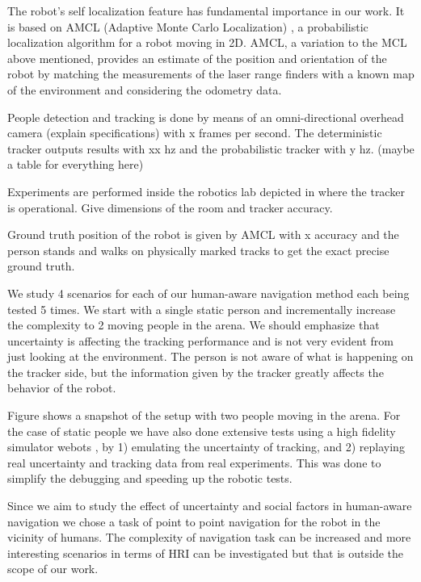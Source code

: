 The robot's self localization feature has fundamental importance in our work.
It is based on AMCL (Adaptive Monte Carlo Localization) \cite{amcl}, a probabilistic localization algorithm for a robot moving in 2D.
AMCL, a variation to the MCL above mentioned, provides an estimate of the position and orientation of the robot by matching the measurements of the laser range finders with a known map of the environment and considering the odometry data.

People detection and tracking is done by means of an omni-directional overhead camera (explain specifications) with x frames per second. The deterministic tracker outputs results with xx hz and the probabilistic tracker with y hz. (maybe a table for everything here)


Experiments are performed inside the robotics lab depicted in where the tracker is operational. Give dimensions of the room and tracker accuracy.


Ground truth position of the robot is given by AMCL with x accuracy and the person stands and walks on physically marked tracks to get the exact precise ground truth.


We study 4 scenarios for each of our human-aware navigation method each being tested 5 times.
We start with a single static person and incrementally increase the complexity to 2 moving people in the arena. We should emphasize that uncertainty is affecting the tracking performance and is not very evident from just looking at the environment. The person is not aware of what is happening on the tracker side, but the information given by the tracker greatly affects the behavior of the robot.



Figure shows a snapshot of the setup with two people moving in the arena. For the case of static people we have also done extensive tests using a high fidelity simulator webots \cite{michel1998webots}, by 1) emulating the uncertainty of tracking, and 2) replaying real uncertainty and tracking data from real experiments. This was done to simplify the debugging and speeding up the robotic tests.

Since we aim to study the effect of uncertainty and social factors in human-aware navigation we chose a task of point to point navigation for the robot in the vicinity of humans. The complexity of navigation task can be increased and more interesting scenarios in terms of HRI can be investigated but that is outside the scope of our work.


